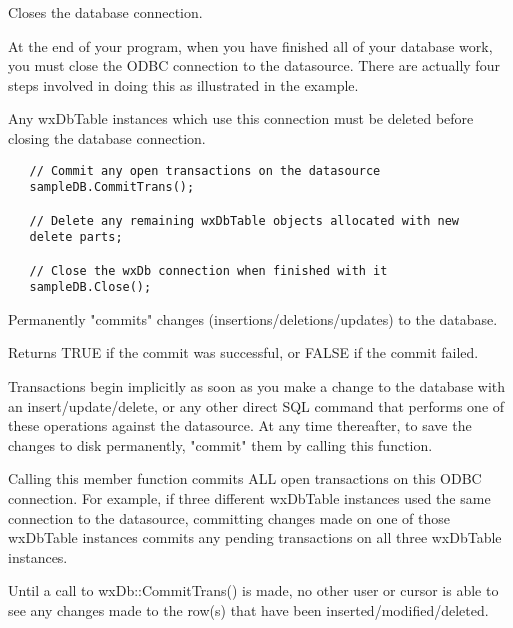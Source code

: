 \label{wxdbclose}


Closes the database connection.


At the end of your program, when you have finished all of your database work,
you must close the ODBC connection to the datasource.  There are actually
four steps involved in doing this as illustrated in the example.

Any wxDbTable instances which use this connection must be deleted before
closing the database connection.


\begin{verbatim}
   // Commit any open transactions on the datasource
   sampleDB.CommitTrans();

   // Delete any remaining wxDbTable objects allocated with new
   delete parts;

   // Close the wxDb connection when finished with it
   sampleDB.Close();
\end{verbatim}


\label{wxdbcommittrans}


Permanently "commits" changes (insertions/deletions/updates) to the database.


Returns TRUE if the commit was successful, or FALSE if the commit failed.


Transactions begin implicitly as soon as you make a change to the database
with an insert/update/delete, or any other direct SQL command that performs
one of these operations against the datasource.
At any time thereafter, to save the changes to disk permanently, "commit"
them by calling this function.

Calling this member function commits ALL open transactions on this ODBC
connection.  For example, if three different wxDbTable instances used the
same connection to the datasource, committing changes made on one of those
wxDbTable instances commits any pending transactions on all three wxDbTable
instances.

Until a call to wxDb::CommitTrans() is made, no other user or cursor is able
to see any changes made to the row(s) that have been inserted/modified/deleted.


